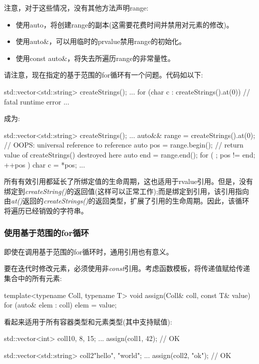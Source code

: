 注意，对于这些情况，没有其他方法声明range:

\begin{itemize}
	\item 使用auto，将创建range的副本(这需要花费时间并禁用对元素的修改)。
	\item 使用auto\&，可以用临时的prvalue禁用range的初始化。
	\item 使用const auto\&，将失去所遍历range的非常量性。
\end{itemize}

请注意，现在指定的基于范围的for循环有一个问题。代码如以下:

\begin{cppcode}
std::vector<std::string> createStrings();
...
for (char c : createStrings().at(0)) { // fatal runtime error
	...
}
\end{cppcode}

成为:

\begin{cppcode}
std::vector<std::string> createStrings();
...
auto&& range = createStrings().at(0); // OOPS: universal reference to reference
auto pos = range.begin(); // return value of createStrings() destroyed here
auto end = range.end();
for ( ; pos != end; ++pos ) {
	char c = *pos;
	...
}
\end{cppcode}

所有有效引用都延长了所绑定值的生命周期，这也适用于rvalue引用。但是，没有绑定到\textit{createString()}的返回值(这样可以正常工作);而是绑定到引用，该引用指向由\textit{at()}返回的\textit{createStrings()}的返回类型，扩展了引用的生命周期。因此，该循环将遍历已经销毁的字符串。

\subsubsection{使用基于范围的for循环}

即使在调用基于范围的for循环时，通用引用也有意义。

要在迭代时修改元素，必须使用非\textit{const}引用。考虑函数模板，将传递值赋给传递集合中的所有元素:

\begin{cppcode}
template<typename Coll, typename T>
void assign(Coll& coll, const T& value) {
	for (auto& elem : coll) {
		elem = value;
	}
}
\end{cppcode}

看起来适用于所有容器类型和元素类型(其中支持赋值):

\begin{cppcode}
std::vector<int> coll1{0, 8, 15};
...
assign(coll1, 42); // OK

std::vector<std::string> coll2{"hello", "world"};
...
assign(coll2, "ok"); // OK
\end{cppcode}

